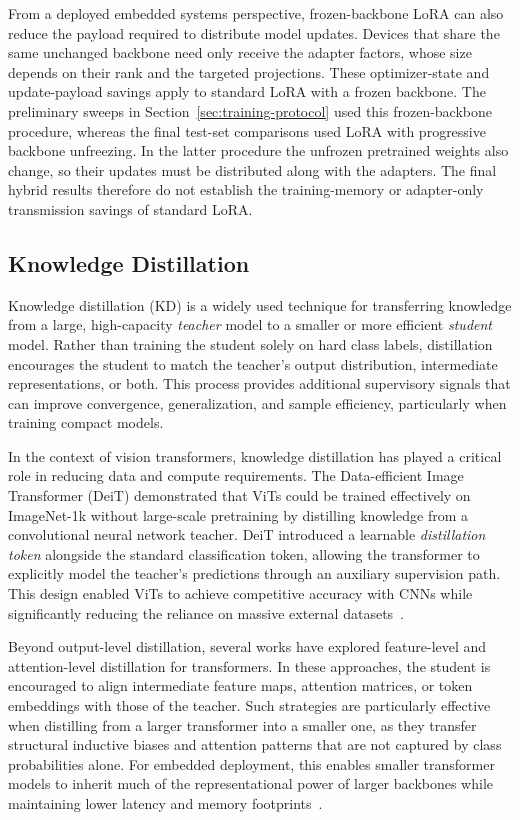 \documentclass[runningheads,a4paper]{llncs}
\begin{document}
From a deployed embedded systems perspective, frozen-backbone LoRA can also reduce the payload required to distribute model updates. Devices that share the same unchanged backbone need only receive the adapter factors, whose size depends on their rank and the targeted projections. These optimizer-state and update-payload savings apply to standard LoRA with a frozen backbone. The preliminary sweeps in Section~\ref{sec:training-protocol} used this frozen-backbone procedure, whereas the final test-set comparisons used LoRA with progressive backbone unfreezing. In the latter procedure the unfrozen pretrained weights also change, so their updates must be distributed along with the adapters. The final hybrid results therefore do not establish the training-memory or adapter-only transmission savings of standard LoRA.

\subsection{Knowledge Distillation}
Knowledge distillation (KD) is a widely used technique for transferring knowledge from a large, high-capacity \emph{teacher} model to a smaller or more efficient \emph{student} model. Rather than training the student solely on hard class labels, distillation encourages the student to match the teacher’s output distribution, intermediate representations, or both. This process provides additional supervisory signals that can improve convergence, generalization, and sample efficiency, particularly when training compact models.

In the context of vision transformers, knowledge distillation has played a critical role in reducing data and compute requirements. The Data-efficient Image Transformer (DeiT) demonstrated that ViTs could be trained effectively on ImageNet-1k without large-scale pretraining by distilling knowledge from a convolutional neural network teacher. DeiT introduced a learnable \emph{distillation token} alongside the standard classification token, allowing the transformer to explicitly model the teacher’s predictions through an auxiliary supervision path. This design enabled ViTs to achieve competitive accuracy with CNNs while significantly reducing the reliance on massive external datasets~\cite{touvron2021deit}.

Beyond output-level distillation, several works have explored feature-level and attention-level distillation for transformers. In these approaches, the student is encouraged to align intermediate feature maps, attention matrices, or token embeddings with those of the teacher. Such strategies are particularly effective when distilling from a larger transformer into a smaller one, as they transfer structural inductive biases and attention patterns that are not captured by class probabilities alone. For embedded deployment, this enables smaller transformer models to inherit much of the representational power of larger backbones while maintaining lower latency and memory footprints~\cite{zhang2022minivit,wu2022tinyvit}.
\end{document}
